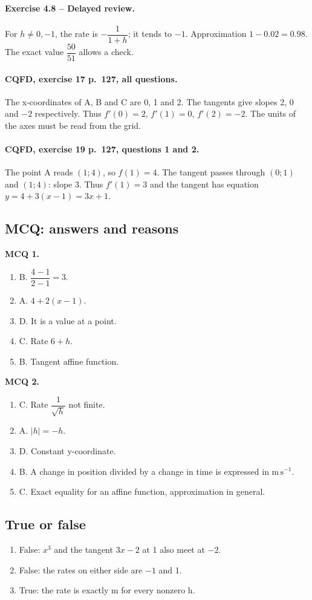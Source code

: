 \paragraph{Exercise 4.8 -- Delayed review.} For $h\ne0,-1$, the rate is $-\dfrac{1}{1+h}$; it tends to $-1$. Approximation $1-0.02=0.98$. The exact value $\dfrac{50}{51}$ allows a check.
\paragraph{CQFD, exercise 17 p.~127, all questions.} The x-coordinates of A, B and C are 0, 1 and 2. The tangents give slopes 2, 0 and $-2$ respectively. Thus $f\prime(0)=2$, $f\prime(1)=0$, $f\prime(2)=-2$. The units of the axes must be read from the grid.
\paragraph{CQFD, exercise 19 p.~127, questions 1 and 2.} The point A reads $(1;4)$, so $f(1)=4$. The tangent passes through $(0;1)$ and $(1;4)$: slope 3. Thus $f\prime(1)=3$ and the tangent has equation $y=4+3(x-1)=3x+1$.
\subsection*{MCQ: answers and reasons}
\textbf{MCQ 1.}
\begin{enumerate}
\item B. $\dfrac{4-1}{2-1}=3$.
\item A. $4+2(x-1)$.
\item D. It is a value at a point.
\item C. Rate $6+h$.
\item B. Tangent affine function.
\end{enumerate}
\textbf{MCQ 2.}
\begin{enumerate}
\item C. Rate $\dfrac{1}{\sqrt h}$ not finite.
\item A. $|h|=-h$.
\item D. Constant y-coordinate.
\item B. A change in position divided by a change in time is expressed in $\mathrm{m\,s^{-1}}$.
\item C. Exact equality for an affine function, approximation in general.
\end{enumerate}
\subsection*{True or false}
\begin{enumerate}
\item False: $x^3$ and the tangent $3x-2$ at 1 also meet at $-2$.
\item False: the rates on either side are $-1$ and 1.
\item True: the rate is exactly m for every nonzero h.
\end{enumerate}
